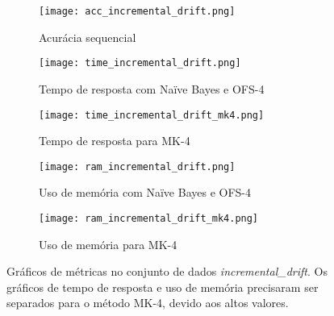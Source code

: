 \begin{figure}[!htb]
\centering
\begin{subfigure}[t]{0.485\textwidth}
\texttt{[image: acc\_incremental\_drift.png]}
\caption{Acurácia sequencial} \label{fig:incremental_1a}
\end{subfigure}
\hfill
\begin{minipage}{\textwidth} 
\begin{subfigure}[t]{0.485\textwidth}
\texttt{[image: time\_incremental\_drift.png]}
\caption{Tempo de resposta com Naïve Bayes e OFS-4} \label{fig:incremental_1b}
\end{subfigure}
\hfill
\begin{subfigure}[t]{0.485\textwidth}
\texttt{[image: time\_incremental\_drift\_mk4.png]}
\caption{Tempo de resposta para MK-4} \label{fig:incremental_1c}
\end{subfigure}
\hfill
\begin{subfigure}[t]{0.485\textwidth}
\texttt{[image: ram\_incremental\_drift.png]}
\caption{Uso de memória com Naïve Bayes e OFS-4} \label{fig:incremental_1d}
\end{subfigure}
\hfill
\begin{subfigure}[t]{0.485\textwidth}
\texttt{[image: ram\_incremental\_drift\_mk4.png]}
\caption{Uso de memória para MK-4} \label{fig:incremental_1e}
\end{subfigure}
\end{minipage}

\caption[Gráficos de métricas no conjunto de dados  \textit{incremental\_drift}]{Gráficos de métricas no conjunto de dados  \textit{incremental\_drift}. Os gráficos de tempo de resposta e uso de memória precisaram ser separados para o método MK-4, devido aos altos valores.} \label{fig:incremental_drift}
\end{figure}



